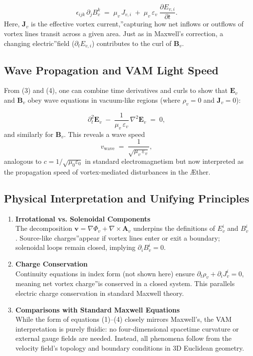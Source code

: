 \[
    \epsilon_{ijk}\,\partial_j B_{v}^k
    \;=\;
    \mu_v\,J_{v,i}
    \;+\;
    \mu_v\,\varepsilon_v\;\frac{\partial E_{v,i}}{\partial t}.
    \tag{4}
\]
Here, \(\mathbf{J}_v\) is the effective \grqq vortex current,\textquotedblright capturing how net inflows or outflows of vortex lines transit across a given area. Just as in Maxwell's correction, a changing \grqq electric\textquotedblright field (\(\partial_t E_{v,i}\)) contributes to the curl of \(\mathbf{B}_v\).

\subsection{Wave Propagation and VAM Light Speed}

From (3) and (4), one can combine time derivatives and curls to show that \(\mathbf{E}_v\) and \(\mathbf{B}_v\) obey wave equations in vacuum-like regions (where \(\rho_v=0\) and \(\mathbf{J}_v=0\)):

\[
    \partial_t^2 \mathbf{E}_v
    \;-\;
    \frac{1}{\mu_v\,\varepsilon_v}\,
    \nabla^2 \mathbf{E}_v
    \;=\; 0,
\]
and similarly for \(\mathbf{B}_v\). This reveals a wave speed
\[
    v_{\mathrm{wave}}
    \;=\;
    \frac{1}{\sqrt{\mu_v\,\varepsilon_v}},
\]
analogous to \(c = 1/\sqrt{\mu_0\varepsilon_0}\) in standard electromagnetism but now interpreted as the propagation speed of vortex-mediated disturbances in the Æther.

\subsection{Physical Interpretation and Unifying Principles}

\begin{enumerate}
    \item \textbf{Irrotational vs. Solenoidal Components} \\
    The decomposition \(\mathbf{v} = \nabla \Phi_v + \nabla\times \mathbf{A}_v\) underpins the definitions of \(E_{v}^i\) and \(B_{v}^i\). Source-like \grqq charges\textquotedblright appear if vortex lines enter or exit a boundary; solenoidal loops remain closed, implying \(\partial_i B_{v}^i=0\).
    \item \textbf{Charge Conservation} \\
    Continuity equations in index form (not shown here) ensure \(\partial_t \rho_v + \partial_i J_{v}^i = 0\), meaning net vortex \grqq charge\textquotedblright is conserved in a closed system. This parallels electric charge conservation in standard Maxwell theory.
    \item \textbf{Comparisons with Standard Maxwell Equations} \\
    While the form of equations (1)--(4) closely mirrors Maxwell's, the VAM interpretation is purely fluidic: no four-dimensional spacetime curvature or external gauge fields are needed. Instead, all phenomena follow from the velocity field's topology and boundary conditions in 3D Euclidean geometry.
\end{enumerate}


